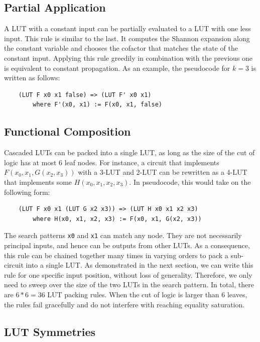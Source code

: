 \subsection{Partial Application}\label{sec:rewrites:application}
A LUT with a constant input can be partially evaluated to a LUT with one less
input. This rule is similar to the last. It computes the Shannon expansion
along the constant variable and chooses the cofactor that matches the state of
the constant input. Applying this rule greedily in combination with the
previous one is equivalent to constant propagation. As an example, the
pseudocode for $k=3$ is written as follows:

\begin{verbatim}
    (LUT F x0 x1 false) => (LUT F' x0 x1)
        where F'(x0, x1) := F(x0, x1, false)
\end{verbatim}

\subsection{Functional Composition}\label{sec:rewrites:composition}

Cascaded LUTs can be packed into a single LUT, as long as the size of the cut
of logic has at most 6 leaf nodes. For instance, a circuit that implements
$F(x_0, x_1, G(x_2, x_3))$ with a 3-LUT and 2-LUT can be rewritten as a 4-LUT
that implements some $H(x_0, x_1, x_2, x_3)$. In pseudocode, this would take on
the following form:
\begin{verbatim}
    (LUT F x0 x1 (LUT G x2 x3)) => (LUT H x0 x1 x2 x3)
        where H(x0, x1, x2, x3) := F(x0, x1, G(x2, x3))
\end{verbatim}

The search patterns \texttt{x0} and \texttt{x1} can match any node. They are
not necessarily principal inputs, and hence can be outputs from other LUTs. As
a consequence, this rule can be chained together many times in varying orders
to pack a sub-circuit into a single LUT. As demonstrated in the next section,
we can write this rule for one specific input position, without loss of
generality. Therefore, we only need to sweep over the size of the two LUTs in
the search pattern. In total, there are $6*6 = 36$ LUT packing rules. When the
cut of logic is larger than 6 leaves, the rules fail gracefully and do not
interfere with reaching equality saturation.
\subsection{LUT Symmetries}\label{sec:rewrites:symmetry}

